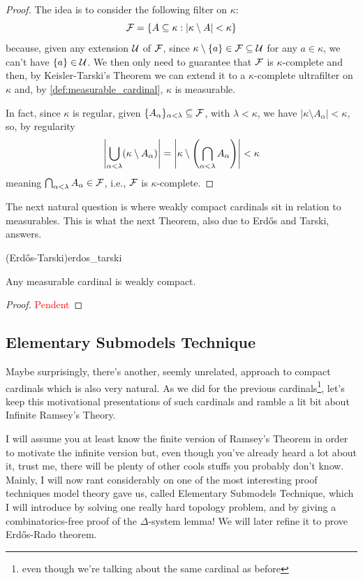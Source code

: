 \begin{proof}
    The idea is to consider the following filter on $\kappa$:
    $$\mathcal{F}=\{A\subseteq\kappa:\lvert\kappa\setminus A\rvert<\kappa\}$$
    because, given any extension $\mathcal{U}$ of $\mathcal{F}$, since $\kappa\setminus\{a\}\in\mathcal{F}\subseteq\mathcal{U}$ for any $a\in\kappa$, we can't have $\{a\}\in\mathcal{U}$. We then only need to guarantee that $\mathcal{F}$ is $\kappa$-complete and then, by Keisler-Tarski's Theorem we can extend it to a $\kappa$-complete ultrafilter on $\kappa$ and, by \cref{def:measurable_cardinal}, $\kappa$ is measurable.

    In fact, since $\kappa$ is regular, given $\{A_\alpha\}_{\alpha<\lambda}\subseteq\mathcal{F}$, with $\lambda<\kappa$, we have $\lvert\kappa\setminus A_\alpha\rvert<\kappa$, so, by regularity
    $$\left\lvert\bigcup_{\alpha<\lambda}(\kappa\setminus A_\alpha)\right\rvert=\left\lvert\kappa\setminus{\left(\bigcap_{\alpha<\lambda} A_\alpha\right)}\right\rvert<\kappa$$
    meaning $\bigcap_{\alpha<\lambda}A_\alpha\in\mathcal{F}$, i.e., $\mathcal{F}$ is $\kappa$-complete.
\end{proof}

The next natural question is where weakly compact cardinals sit in relation to measurables. This is what the next Theorem, also due to Erdős and Tarski, answers.

\begin{theorem}{(Erdős-Tarski)}{erdos_tarski}

    Any measurable cardinal is weakly compact.
\end{theorem}

\begin{proof}
    \textcolor{red}{Pendent}
\end{proof}

\subsection{Elementary Submodels Technique}

Maybe surprisingly, there's another, seemly unrelated, approach to compact cardinals which is also very natural. As we did for the previous cardinals\footnote{even though we're talking about the same cardinal as before}, let's keep this motivational presentations of such cardinals and ramble a lit bit about Infinite Ramsey's Theory.

I will assume you at least know the finite version of Ramsey's Theorem in order to motivate the infinite version but, even though you've already heard a lot about it, trust me, there will be plenty of other cools stuffs you probably don't know. Mainly, I will now rant considerably on one of the most interesting proof techniques model theory gave us, called Elementary Submodels Technique, which I will introduce by solving one really hard topology problem, and by giving a combinatorics-free proof of the $\Delta$-system lemma! We will later refine it to prove Erdős-Rado theorem.

